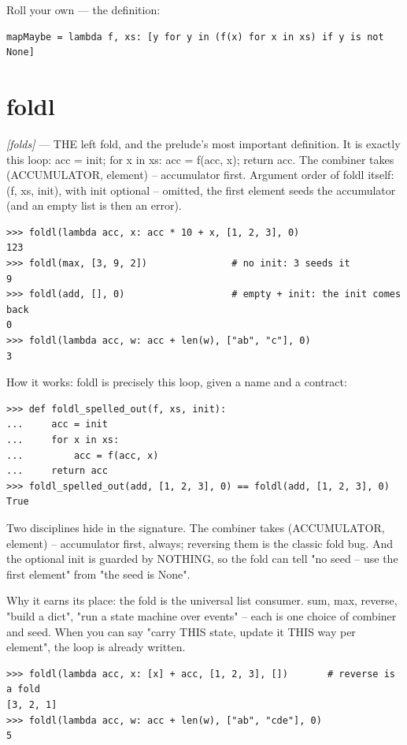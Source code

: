 \documentclass[11pt,letterpaper]{book}
\begin{document}
Roll your own --- the definition:

\begin{lstlisting}[style=code]
mapMaybe = lambda f, xs: [y for y in (f(x) for x in xs) if y is not None]
\end{lstlisting}

\section{foldl}
\noindent\textit{[folds]} --- THE left fold, and the prelude's most important definition. It is exactly this loop: acc = init; for x in xs: acc = f(acc, x); return acc. The combiner takes (ACCUMULATOR, element) -- accumulator first. Argument order of foldl itself: (f, xs, init), with init optional -- omitted, the first element seeds the accumulator (and an empty list is then an error).
\begin{lstlisting}[style=spec]
>>> foldl(lambda acc, x: acc * 10 + x, [1, 2, 3], 0)
123
>>> foldl(max, [3, 9, 2])               # no init: 3 seeds it
9
>>> foldl(add, [], 0)                   # empty + init: the init comes back
0
>>> foldl(lambda acc, w: acc + len(w), ["ab", "c"], 0)
3
\end{lstlisting}

How it works: foldl is precisely this loop, given a name and a contract:

\begin{lstlisting}[style=spec]
>>> def foldl_spelled_out(f, xs, init):
...     acc = init
...     for x in xs:
...         acc = f(acc, x)
...     return acc
>>> foldl_spelled_out(add, [1, 2, 3], 0) == foldl(add, [1, 2, 3], 0)
True
\end{lstlisting}

Two disciplines hide in the signature. The combiner takes (ACCUMULATOR, element) -- accumulator first, always; reversing them is the classic fold bug. And the optional init is guarded by NOTHING, so the fold can tell "no seed -- use the first element" from "the seed is None".


Why it earns its place: the fold is the universal list consumer. sum, max, reverse, "build a dict", "run a state machine over events" -- each is one choice of combiner and seed. When you can say "carry THIS state, update it THIS way per element", the loop is already written.

\begin{lstlisting}[style=spec]
>>> foldl(lambda acc, x: [x] + acc, [1, 2, 3], [])       # reverse is a fold
[3, 2, 1]
>>> foldl(lambda acc, w: acc + len(w), ["ab", "cde"], 0)
5
\end{lstlisting}
\end{document}
